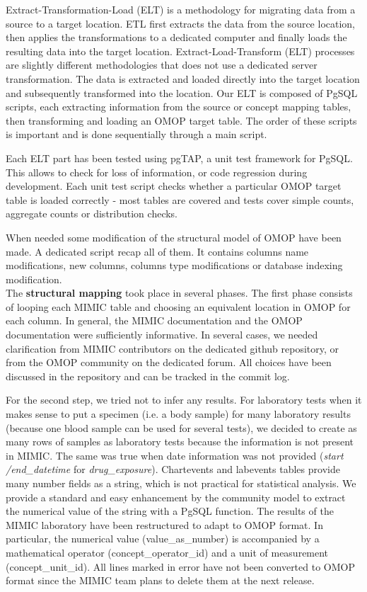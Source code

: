 Extract-Transformation-Load (ELT) is a methodology for migrating data from a 
source to a target location. ETL first extracts the data from the source location, 
then applies the transformations to a dedicated computer and finally loads the 
resulting data into the target location. Extract-Load-Transform (ELT) processes 
are slightly different methodologies that does not use a dedicated server 
transformation. The data is extracted and loaded directly into the target location 
and subsequently transformed into the location.
Our ELT is composed of PgSQL scripts, each extracting information from the source 
or concept mapping tables, then transforming and loading an OMOP target table. 
The order of these scripts is important and is done sequentially through a main 
script.

Each ELT part has been tested using pgTAP, a unit test framework for PgSQL.
This allows to check for loss of information, or code regression during
development. Each unit test script checks whether a particular OMOP target
table is loaded correctly - most tables are covered and tests cover simple
counts, aggregate counts or distribution checks.

When needed some modification of the structural model of OMOP have been made. A
dedicated script recap all of them. It contains columns name modifications, new
columns, columns type modifications or database indexing modification.
\\

The \textbf{structural mapping} took place in several phases.
The first phase consists of looping each MIMIC table and choosing an equivalent 
location in OMOP for each column. In general, the MIMIC documentation and the OMOP 
documentation were sufficiently informative. In several cases, we needed 
clarification from MIMIC contributors on the dedicated github repository, or from 
the OMOP community on the dedicated forum. All choices have been discussed in the 
repository \cite{mimic-omop-github} and can be tracked in the commit log.

For the second step, we tried not to infer any results. For laboratory tests when 
it makes sense to put a specimen (i.e. a body sample) for many laboratory results 
(because one blood sample can be used for several tests), we decided to create as 
many rows of samples as laboratory tests because the information is not present 
in MIMIC. The same was true when date information was not provided (\textit{start
/end\_datetime} for \textit{drug\_exposure}).
Chartevents and labevents tables provide many number fields as a string, which is 
not practical for statistical analysis. We provide a standard and easy enhancement 
by the community model to extract the numerical value of the string with a PgSQL 
function. The results of the MIMIC laboratory have been restructured to adapt to 
OMOP format. In particular, the numerical value (value\_as\_number) is accompanied 
by a mathematical operator (concept\_operator\_id) and a unit of measurement 
(concept\_unit\_id). All lines marked in error have not been converted to OMOP 
format since the MIMIC team plans to delete them at the next release.

